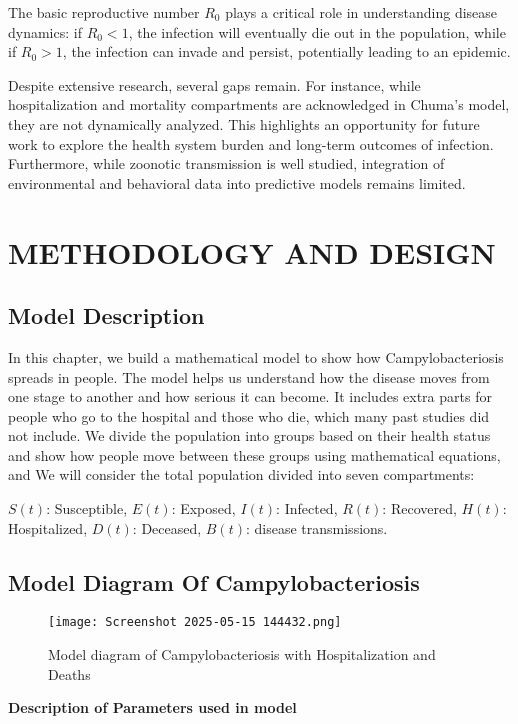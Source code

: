 \documentclass[a4paper,12pt]{report}
\begin{document}
The basic reproductive number \( R_0 \) plays a critical role in understanding disease dynamics: if \( R_0 < 1 \), the infection will eventually die out in the population, while if \( R_0 > 1 \), the infection can invade and persist, potentially leading to an epidemic.





Despite extensive research, several gaps remain. For instance, while hospitalization and mortality compartments are acknowledged in Chuma's model, they are not dynamically analyzed. This highlights an opportunity for future work to explore the health system burden and long-term outcomes of infection. Furthermore, while zoonotic transmission is well studied, integration of environmental and behavioral data into predictive models remains limited.


\newpage

\chapter{ METHODOLOGY AND DESIGN}


\section{ Model Description}
In this chapter, we build a mathematical model to show how Campylobacteriosis spreads in people. The model helps us understand how the disease moves from one stage to another and how serious it can become. It includes extra parts for people who go to the hospital and those who die, which many past studies did not include. We divide the population into groups based on their health status and show how people move between these groups using mathematical equations, and 
We will consider the total population divided into seven compartments:

   $S(t)$: Susceptible,
  $E(t)$: Exposed,
   $I(t)$: Infected,
   $R(t)$: Recovered,
   $H(t)$: Hospitalized,
   $D(t)$: Deceased,
   $B(t)$: disease transmissions. \\

\section{Model Diagram Of Campylobacteriosis}
\begin{figure}[htbp]
    \centering
    \texttt{[image: Screenshot 2025-05-15 144432.png]}
    \caption{Model diagram of Campylobacteriosis with Hospitalization and Deaths}
    \label{fig:enter-label}
\end{figure}
\textbf{Description of Parameters used in model }
\end{document}
